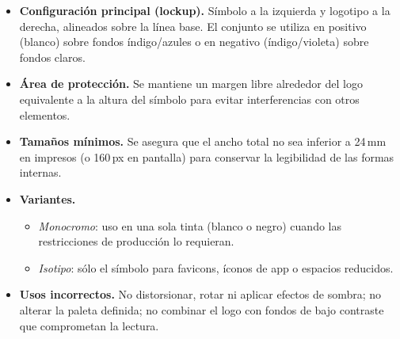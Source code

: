 \begin{itemize}
    \item \textbf{Configuración principal (lockup).} Símbolo a la izquierda y logotipo a la derecha, alineados sobre la línea base. El conjunto se utiliza en positivo (blanco) sobre fondos índigo/azules o en negativo (índigo/violeta) sobre fondos claros.
    \item \textbf{Área de protección.} Se mantiene un margen libre alrededor del logo equivalente a la altura del símbolo para evitar interferencias con otros elementos.
    \item \textbf{Tamaños mínimos.} Se asegura que el ancho total no sea inferior a 24\,mm en impresos (o 160\,px en pantalla) para conservar la legibilidad de las formas internas.
    \item \textbf{Variantes.} 
    \begin{itemize}
        \item \textit{Monocromo}: uso en una sola tinta (blanco o negro) cuando las restricciones de producción lo requieran.
        \item \textit{Isotipo}: sólo el símbolo para favicons, íconos de app o espacios reducidos.
    \end{itemize}
    \item \textbf{Usos incorrectos.} No distorsionar, rotar ni aplicar efectos de sombra; no alterar la paleta definida; no combinar el logo con fondos de bajo contraste que comprometan la lectura.
\end{itemize}

\vspace{1cm}